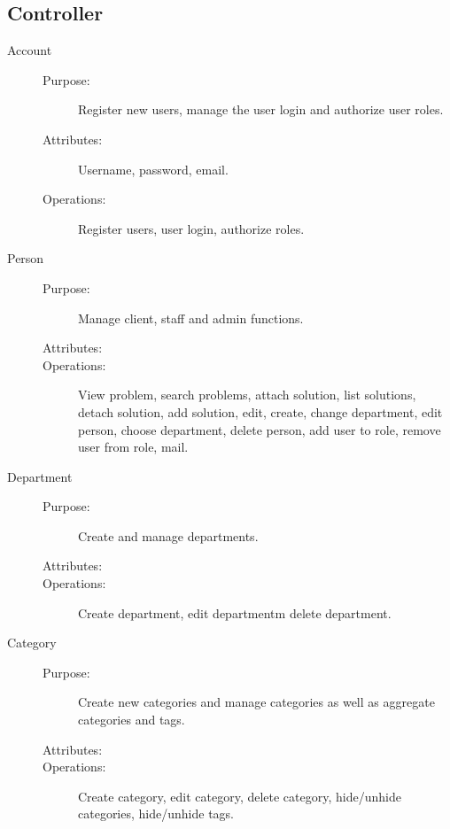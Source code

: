 \subsection{Controller}

\begin{description}
\item[Account]\hfill
\begin{description}
\item[Purpose:]Register new users, manage the user login and authorize user roles.
\item[Attributes:] Username, password, email.
\item[Operations:]Register users, user login, authorize roles.
\end{description}
\end{description}

\begin{description}
\item[Person]\hfill
\begin{description}
\item[Purpose:]Manage client, staff and admin functions.
\item[Attributes:]
\item[Operations:]View problem, search problems, attach solution, list solutions, detach solution, add solution, edit, create, change department, edit person, choose department, delete person, add user to role, remove user from role, mail.
\end{description}
\end{description}

\begin{description}
\item[Department]\hfill
\begin{description}
\item[Purpose:]Create and manage departments.
\item[Attributes:]
\item[Operations:]Create department, edit departmentm delete department.
\end{description}
\end{description}

\begin{description}
\item[Category]\hfill
\begin{description}
\item[Purpose:]Create new categories and manage categories as well as aggregate categories and tags.
\item[Attributes:]
\item[Operations:]Create category, edit category, delete category, hide/unhide categories, hide/unhide tags.
\end{description}
\end{description}

